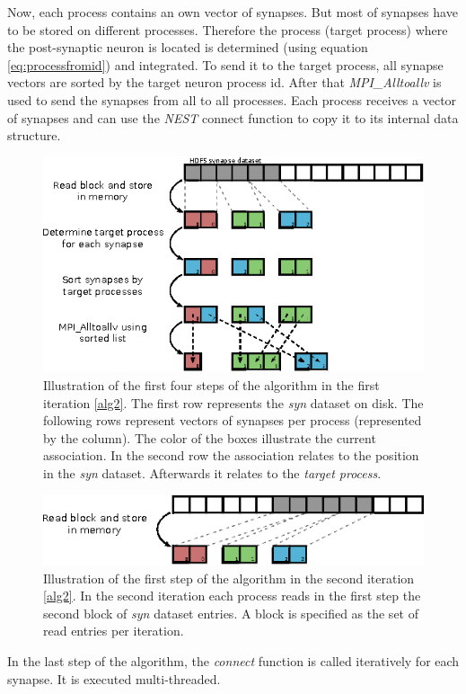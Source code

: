 Now, each process contains an own vector of synapses.
But most of synapses have to be stored on different processes.
Therefore the process (target process) where the post-synaptic neuron is located is determined (using equation \ref{eq:processfromid})
and integrated.
To send it to the target process, all synapse vectors are sorted by the target neuron process id.
After that \emph{MPI\_Alltoallv} is used to send the synapses from all to all processes.
Each process receives a vector of synapses and can use the \emph{NEST} connect function to copy it to its internal data structure.
\begin{figure}[ht!]
\centering
\includegraphics[scale=2.0]{pictures/import_syn_vis.eps}
\caption{Illustration of the first four steps of the algorithm in the first iteration \ref{alg2}.
The first row represents the \emph{syn} dataset on disk.
The following rows represent vectors of synapses per process (represented by the column).
The color of the boxes illustrate the current association.
In the second row the association relates to the position in the \emph{syn} dataset.
Afterwards it relates to the \emph{target process}.
}
\label{fig:importsynvis}
\end{figure}

\begin{figure}[ht!]
\centering
\includegraphics[scale=2.0]{pictures/import_syn_vis_second_it.eps}
\caption{Illustration of the first step of the algorithm in the second iteration \ref{alg2}.
In the second iteration each process reads in the first step the second block of \emph{syn} dataset entries.
A block is specified as the set of read entries per iteration.}
\label{fig:importsynvis2nd}
\end{figure}
\newpage
In the last step of the algorithm, the \emph{connect} function is called iteratively for each synapse.
It is executed multi-threaded.

